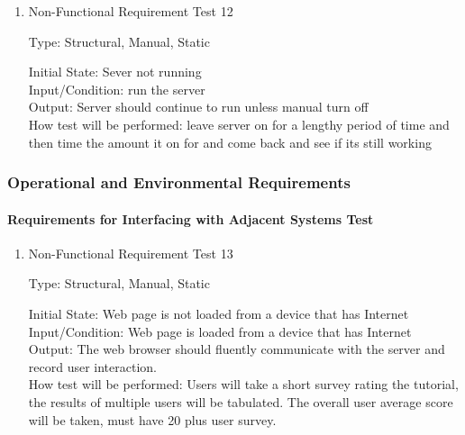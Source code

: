 \documentclass[12pt, titlepage]{article}
\begin{document}
\begin{enumerate}


\item{Non-Functional Requirement Test 12\\}

Type: Structural, Manual, Static
					
Initial State: Sever not running \\
					
Input/Condition: run the server \\
					
Output: Server should continue to run unless manual turn off \\
					
How test will be performed: leave server on for a lengthy period of time and then time the amount it
on for and come back and see if its still working \\

\end{enumerate}

\subsubsection{Operational and Environmental Requirements}

\paragraph{Requirements for Interfacing with Adjacent Systems Test}

\begin{enumerate}

\item{Non-Functional Requirement Test 13\\}

Type: Structural, Manual, Static
					
Initial State: Web page is not loaded from a device that has Internet \\
					
Input/Condition: Web page is loaded from a device that has Internet \\
					
Output: The web browser should fluently communicate with the server and record user interaction.  \\
					
How test will be performed: Users will take a short survey rating the tutorial, the results of multiple users will be
tabulated. The overall user average score will be taken, must have 20 plus user survey.    \\

\end{enumerate}
\end{document}
